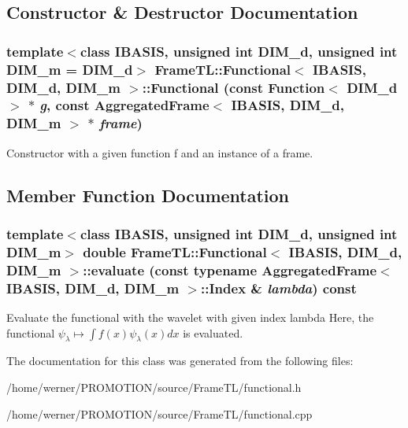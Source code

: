 \subsection{Constructor \& Destructor Documentation}
\hypertarget{classFrameTL_1_1Functional_83bf7391168b379d55c45f09f9e18dfb}{
\subsubsection[Functional]{\setlength{\rightskip}{0pt plus 5cm}template$<$class IBASIS, unsigned int DIM\_\-d, unsigned int DIM\_\-m = DIM\_\-d$>$ {\bf FrameTL::Functional}$<$ IBASIS, DIM\_\-d, DIM\_\-m $>$::{\bf Functional} (const Function$<$ DIM\_\-d $>$ $\ast$ {\em g}, \/  const {\bf AggregatedFrame}$<$ IBASIS, DIM\_\-d, DIM\_\-m $>$ $\ast$ {\em frame})}}
\label{classFrameTL_1_1Functional_83bf7391168b379d55c45f09f9e18dfb}


Constructor with a given function f and an instance of a frame. 

\subsection{Member Function Documentation}
\hypertarget{classFrameTL_1_1Functional_e1cb262dd592892e2fbc616dbf370605}{
\subsubsection[evaluate]{\setlength{\rightskip}{0pt plus 5cm}template$<$class IBASIS, unsigned int DIM\_\-d, unsigned int DIM\_\-m$>$ double {\bf FrameTL::Functional}$<$ IBASIS, DIM\_\-d, DIM\_\-m $>$::evaluate (const typename {\bf AggregatedFrame}$<$ IBASIS, DIM\_\-d, DIM\_\-m $>$::Index \& {\em lambda}) const}}
\label{classFrameTL_1_1Functional_e1cb262dd592892e2fbc616dbf370605}


Evaluate the functional with the wavelet with given index lambda Here, the functional $\psi_\lambda \mapsto \int f(x) \psi_\lambda(x) dx$ is evaluated. 

The documentation for this class was generated from the following files:\begin{CompactItemize}
\item 
/home/werner/PROMOTION/source/FrameTL/functional.h\item 
/home/werner/PROMOTION/source/FrameTL/functional.cpp\end{CompactItemize}
